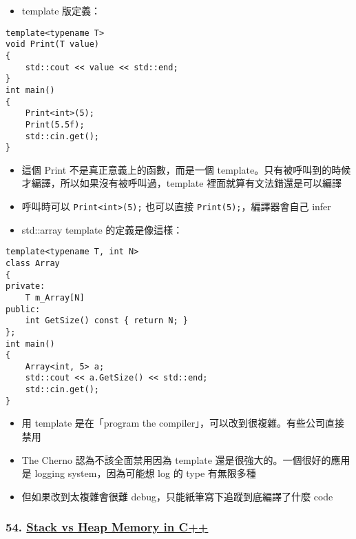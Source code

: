 \documentclass[11pt]{article}
\providecommand{\tightlist}{%
      \setlength{\itemsep}{0pt}\setlength{\parskip}{0pt}}
\begin{document}
\begin{itemize}
\tightlist
\item
  template 版定義：
\end{itemize}

\begin{verbatim}
template<typename T>
void Print(T value)
{
    std::cout << value << std::end;
}
int main()
{
    Print<int>(5);
    Print(5.5f);
    std::cin.get();
}
\end{verbatim}

\begin{itemize}
\tightlist
\item
  這個 Print 不是真正意義上的函數，而是一個
  template。只有被呼叫到的時候才編譯，所以如果沒有被呼叫過，template
  裡面就算有文法錯還是可以編譯
\item
  呼叫時可以 \texttt{Print\textless{}int\textgreater{}(5);} 也可以直接
  \texttt{Print(5);}，編譯器會自己 infer
\item
  std::array template 的定義是像這樣：
\end{itemize}

\begin{verbatim}
template<typename T, int N>
class Array
{
private:
    T m_Array[N]
public: 
    int GetSize() const { return N; }
};
int main()
{
    Array<int, 5> a;
    std::cout << a.GetSize() << std::end;
    std::cin.get();
}
\end{verbatim}

\begin{itemize}
\tightlist
\item
  用 template 是在「program the
  compiler」，可以改到很複雜。有些公司直接禁用
\item
  The Cherno 認為不該全面禁用因為 template
  還是很強大的。一個很好的應用是 logging system，因為可能想 log 的 type
  有無限多種
\item
  但如果改到太複雜會很難 debug，只能紙筆寫下追蹤到底編譯了什麼 code
\end{itemize}

\hypertarget{stack-vs-heap-memory-in-c}{%
\subsubsection{\texorpdfstring{54.
\href{https://www.youtube.com/watch?v=wJ1L2nSIV1s\&list=PLlrATfBNZ98dudnM48yfGUldqGD0S4FFb\&index=54}{Stack
vs Heap Memory in
C++}}{54. Stack vs Heap Memory in C++}}\label{stack-vs-heap-memory-in-c}}
\end{document}
